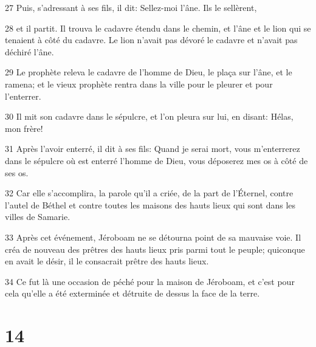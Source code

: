 \par 27 Puis, s'adressant à ses fils, il dit: Sellez-moi l'âne. Ils le sellèrent,
\par 28 et il partit. Il trouva le cadavre étendu dans le chemin, et l'âne et le lion qui se tenaient à côté du cadavre. Le lion n'avait pas dévoré le cadavre et n'avait pas déchiré l'âne.
\par 29 Le prophète releva le cadavre de l'homme de Dieu, le plaça sur l'âne, et le ramena; et le vieux prophète rentra dans la ville pour le pleurer et pour l'enterrer.
\par 30 Il mit son cadavre dans le sépulcre, et l'on pleura sur lui, en disant: Hélas, mon frère!
\par 31 Après l'avoir enterré, il dit à ses fils: Quand je serai mort, vous m'enterrerez dans le sépulcre où est enterré l'homme de Dieu, vous déposerez mes os à côté de ses os.
\par 32 Car elle s'accomplira, la parole qu'il a criée, de la part de l'Éternel, contre l'autel de Béthel et contre toutes les maisons des hauts lieux qui sont dans les villes de Samarie.
\par 33 Après cet événement, Jéroboam ne se détourna point de sa mauvaise voie. Il créa de nouveau des prêtres des hauts lieux pris parmi tout le peuple; quiconque en avait le désir, il le consacrait prêtre des hauts lieux.
\par 34 Ce fut là une occasion de péché pour la maison de Jéroboam, et c'est pour cela qu'elle a été exterminée et détruite de dessus la face de la terre.

\chapter{14}

